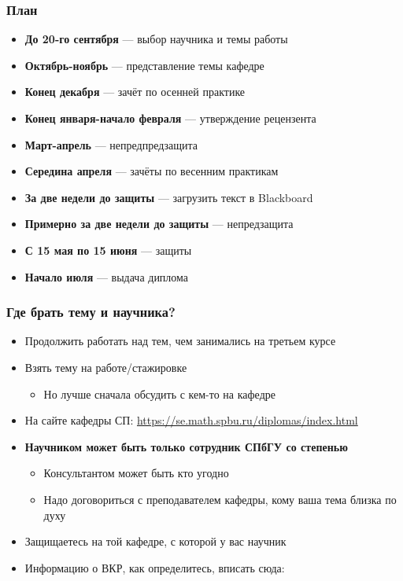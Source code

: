 \documentclass{../../slides-style}
\begin{document}
    \begin{frame}[plain]
        \titlepage
    \end{frame}

    \begin{frame}
        \frametitle{План}
        \begin{itemize}
            \item \textbf{До 20-го сентября} --- выбор научника и темы работы
            \item \textbf{Октябрь-ноябрь} --- представление темы кафедре
            \item \textbf{Конец декабря} --- зачёт по осенней практике
            \item \textbf{Конец января-начало февраля} --- утверждение рецензента
            \item \textbf{Март-апрель} --- непредпредзащита
            \item \textbf{Середина апреля} --- зачёты по весенним практикам
            \item \textbf{За две недели до защиты} --- загрузить текст в Blackboard
            \item \textbf{Примерно за две недели до защиты} --- непредзащита
            \item \textbf{С 15 мая по 15 июня} --- защиты
            \item \textbf{Начало июля} --- выдача диплома
        \end{itemize}
    \end{frame}
    
    \begin{frame}
        \frametitle{Где брать тему и научника?}
        \begin{itemize}
            \item Продолжить работать над тем, чем занимались на третьем курсе
            \item Взять тему на работе/стажировке
            \begin{itemize}
                \item Но лучше сначала обсудить с кем-то на кафедре
            \end{itemize}
            \item На сайте кафедры СП: \url{https://se.math.spbu.ru/diplomas/index.html}
            \item \textbf{Научником может быть только сотрудник СПбГУ со степенью}
            \begin{itemize}
                \item Консультантом может быть кто угодно
                \item Надо договориться с преподавателем кафедры, кому ваша тема близка по духу
            \end{itemize}
            \item Защищаетесь на той кафедре, с которой у вас научник
            \item Информацию о ВКР, как определитесь, вписать сюда: \url{}
        \end{itemize}
    \end{frame}
\end{document}
